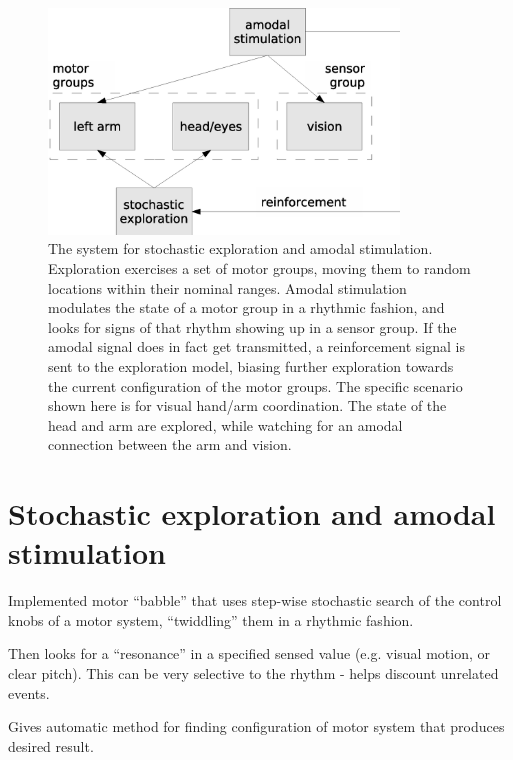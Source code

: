 
\begin{figure}[bt]
\centerline{\includegraphics[height=6cm]{images/amodal-modules}}
\caption {
%
\label{fig:amodal-module}
%
The system for stochastic exploration and amodal stimulation.
Exploration exercises a set of motor groups, moving them
to random locations within their nominal ranges.
Amodal stimulation modulates the state of a motor group
in a rhythmic fashion, and looks for signs of that rhythm 
showing up in a sensor group. If the amodal signal does in
fact get transmitted, a reinforcement signal is sent to the
exploration model, biasing further exploration towards the
current configuration of the motor groups.
%
The specific scenario shown here is for visual hand/arm coordination.
The state of the head and arm are explored, while watching for
an amodal connection between the arm and vision.
%
}
\end{figure}

\section{Stochastic exploration and amodal stimulation}

Implemented motor ``babble'' that uses step-wise stochastic search of
the control knobs of a motor system, ``twiddling'' them in a rhythmic
fashion.

Then looks for a ``resonance'' in a specified sensed value
(e.g. visual motion, or clear pitch).  This can be very selective to
the rhythm - helps discount unrelated events.

Gives automatic method for finding configuration of motor system that
produces desired result.


